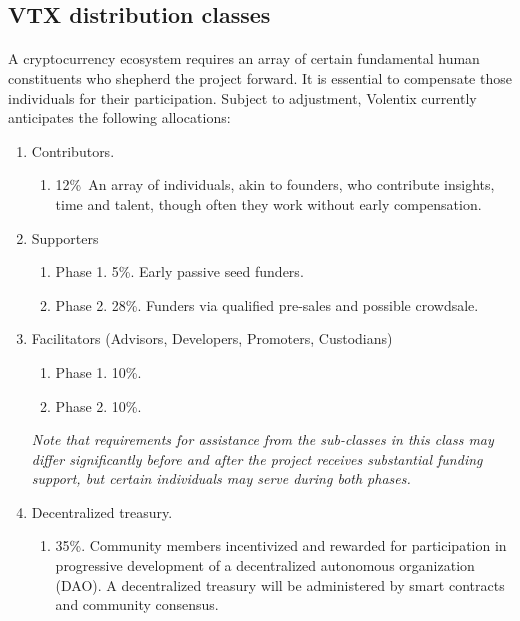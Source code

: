 \documentclass[]{article}
\begin{document}
{\subsection{VTX distribution classes}

\paragraph {}
A cryptocurrency ecosystem requires an array of certain fundamental human constituents who shepherd the project forward. \cite{27}   It is essential to compensate those individuals for their participation. Subject to adjustment, Volentix currently anticipates the following allocations:  
\begin{enumerate}
\item Contributors. 
	\begin{enumerate}
	\item  12\%\ An array of individuals, akin to founders, who contribute insights, time and talent, though often they work without early compensation. 
	\end{enumerate}

\item Supporters\
	\begin{enumerate}
		\item Phase 1. 5\%. Early passive seed funders.
		\item Phase 2. 28\%. Funders via qualified pre-sales and possible crowdsale.  
	\end{enumerate}
\item {Facilitators} 
(Advisors, Developers, Promoters, Custodians)\
	\begin{enumerate}
		\item Phase 1. 10\%. 
		\item Phase 2. 10\%. \
	\end{enumerate}
 \textit{Note that requirements for assistance from the sub-classes in this class may differ significantly before and after the project receives substantial funding support, but certain individuals may serve during both phases. }
\item Decentralized treasury. 
\begin{enumerate}
	\item 35\%. Community members incentivized and rewarded for participation in progressive development of a decentralized autonomous organization (DAO). A decentralized treasury will be administered by smart contracts and community consensus.

\end{enumerate}




\end{enumerate}}
\end{document}
